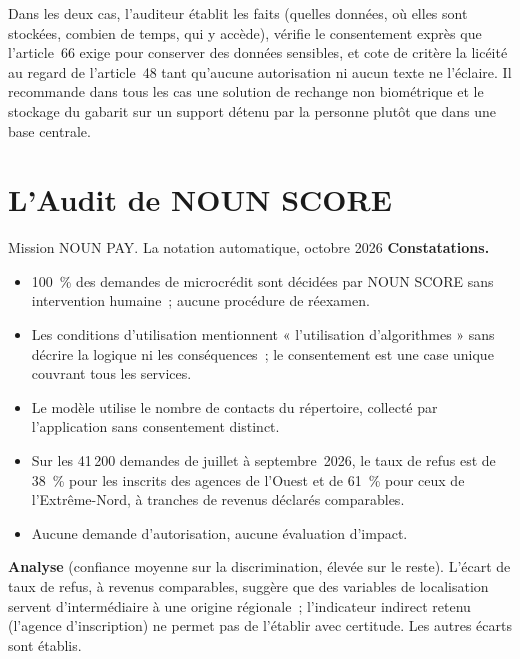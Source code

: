 Dans les deux cas, l'auditeur établit les faits (quelles données, où elles
sont stockées, combien de temps, qui y accède), vérifie le consentement
exprès que l'article~66 exige pour conserver des données sensibles, et cote
\NEK{} de critère la licéité au regard de l'article~48 tant qu'aucune
autorisation ni aucun texte ne l'éclaire. Il recommande dans tous les cas
une solution de rechange non biométrique et le stockage du gabarit sur un
support détenu par la personne plutôt que dans une base centrale.

\section{L'Audit de NOUN SCORE}
\label{sec:c14-nounpay}

\begin{boxscenario}{Mission NOUN PAY. La notation automatique, octobre 2026}
\textbf{Constatations.}
\begin{itemize}
    \item 100~\% des demandes de microcrédit sont décidées par NOUN SCORE
          sans intervention humaine~; aucune procédure de réexamen.
    \item Les conditions d'utilisation mentionnent « l'utilisation
          d'algorithmes » sans décrire la logique ni les conséquences~; le
          consentement est une case unique couvrant tous les services.
    \item Le modèle utilise le nombre de contacts du répertoire, collecté
          par l'application sans consentement distinct.
    \item Sur les 41\,200 demandes de juillet à septembre~2026, le taux de
          refus est de 38~\% pour les inscrits des agences de l'Ouest et de
          61~\% pour ceux de l'Extrême-Nord, à tranches de revenus déclarés
          comparables.
    \item Aucune demande d'autorisation, aucune évaluation d'impact.
\end{itemize}

\textbf{Analyse} (confiance moyenne sur la discrimination, élevée sur le
reste). L'écart de taux de refus, à revenus comparables, suggère que des
variables de localisation servent d'intermédiaire à une origine
régionale~; l'indicateur indirect retenu (l'agence d'inscription) ne permet
pas de l'établir avec certitude. Les autres écarts sont établis.
\end{boxscenario}

